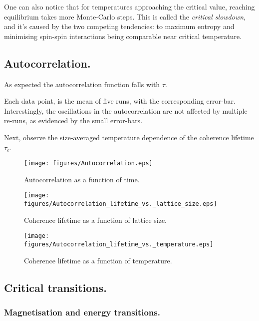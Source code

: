 \documentclass[12pt]{article}
\begin{document}
One can also notice that for temperatures approaching the critical value, reaching equilibrium takes more Monte-Carlo steps. This is called the \emph{critical slowdown}, and it's caused by the two competing tendencies: to maximum entropy and minimising spin-spin interactions being comparable near critical temperature. 



\subsection{Autocorrelation.}

As expected the autocorrelation function falls with \( \tau \).

Each data point, is the mean of five runs, with the corresponding error-bar. Interestingly, the oscillations in the autocorrelation are not affected by multiple re-runs, as evidenced by the small error-bars.

Next, observe the size-averaged temperature dependence of the coherence lifetime \(\tau_e\).

\begin{figure}[p]
  \centering
  \texttt{[image: figures/Autocorrelation.eps]}
  \caption{Autocorrelation as a function of time. }\label{fig:auto_time_plot}
\end{figure}

\begin{figure}[p]
  \centering
  \texttt{[image: figures/Autocorrelation\_lifetime\_vs.\_lattice\_size.eps]}
  \caption{Coherence lifetime as a function of lattice size. }\label{fig:coherence_size}
\end{figure}

\begin{figure}[p]
    \texttt{[image: figures/Autocorrelation\_lifetime\_vs.\_temperature.eps]}
    \caption{Coherence lifetime as a function of temperature.}\label{fig:coherence_temp}
  \end{figure}

  
\subsection{Critical transitions.}

\subsubsection{Magnetisation and energy transitions.}
\end{document}
